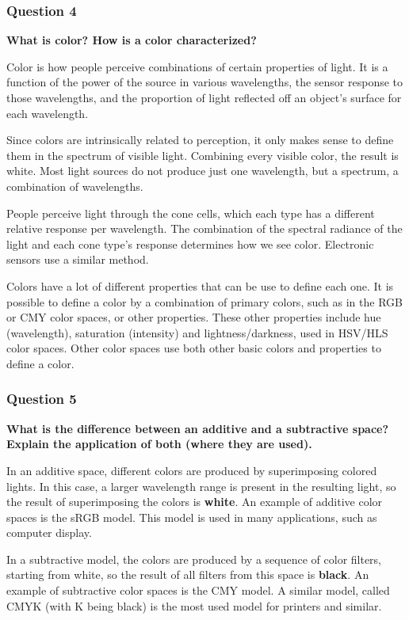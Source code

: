 \documentclass[12pt]{article}
\begin{document}
\subsubsection*{Question 4}
{\bfseries What is color?  How is a color characterized?}

Color is how people perceive combinations of certain properties of light. It is a function of the power of the source in various wavelengths, the sensor response to those wavelengths, and the proportion of light reflected off an object's surface for each wavelength.

Since colors are intrinsically related to perception, it only makes sense to define them in the spectrum of visible light. Combining every visible color, the result is white. Most light sources do not produce just one wavelength, but a spectrum, a combination of wavelengths. 

People perceive light through the cone cells, which each type has a different relative response per wavelength. The combination of the spectral radiance of the light and each cone type's response determines how we see color. Electronic sensors use a similar method.

Colors have a lot of different properties that can be use to define each one. It is possible to define a color by a combination of primary colors, such as in the RGB or CMY color spaces, or other properties. These other properties include hue (wavelength), saturation (intensity) and lightness/darkness, used in HSV/HLS color spaces. Other color spaces use both other basic colors and properties to define a color.

\subsubsection*{Question 5}
{\bfseries What is the difference between an additive and a subtractive space?  Explain the application of both (where they are used).}

In an additive space, different colors are produced by superimposing colored lights. In this case, a larger wavelength range is present in the resulting light, so the result of superimposing the colors is \textbf{white}. An example of additive color spaces is the sRGB model. This model is used in many applications, such as computer display.

In a subtractive model, the colors are produced by a sequence of color filters, starting from white, so the result of all filters from this space is \textbf{black}. An example of subtractive color spaces is the CMY model. A similar model, called CMYK (with K being black) is the most used model for printers and similar.
\end{document}
